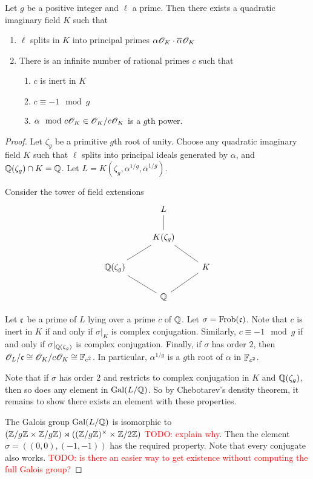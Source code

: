 \documentclass{amsart}
\begin{document}
\begin{lemma}\label{lem:K-exists}
  Let $g$ be a positive integer and $\ell$ a prime. Then there exists a quadratic imaginary field $K$ such that
  \begin{enumerate}
    \item $\ell$ splits in $K$ into principal primes $\alpha\mathscr{O}_K \cdot \overline{\alpha}\mathscr{O}_K$
    \item There is an infinite number of rational primes $c$ such that
    \begin{enumerate}
      \item $c$ is inert in $K$
      \item $c \equiv -1 \mod{g}$
      \item $\alpha \mod c\mathscr{O}_K \in \mathscr{O}_K/c\mathscr{O}_K$ is a $g$th power.
    \end{enumerate}
  \end{enumerate}
\end{lemma}
\begin{proof}
    Let $\zeta_g$ be a primitive $g$th root of unity. Choose any quadratic imaginary field $K$ such that $\ell$ splits into principal ideals generated by $\alpha$, and $\mathbb{Q}(\zeta_g) \cap K = \mathbb{Q}$. Let $L = K(\zeta_g,\alpha^{1/g},\overline{\alpha}^{1/g})$.

  Consider the tower of field extensions
  \[
  \begin{tikzcd}
    &
    L
    \arrow[d,-]
    \\
    &
    K(\zeta_g)
    \arrow[dl,-] \arrow[dr,-]
    \\
    \Q(\zeta_g)
    \arrow[dr,-]
    &&
    K
    \arrow[dl,-]
    \\
    &
    \Q
  \end{tikzcd}
  \]

  Let $\frak{c}$ be a prime of $L$ lying over a prime $c$ of $\mathbb{Q}$. Let $\sigma = \mathrm{Frob}(\frak{c})$. Note that $c$ is inert in $K$ if and only if $\sigma|_K$ is complex conjugation. Similarly, $c \equiv -1 \mod{g}$ if and only if $\sigma|_{\mathbb{Q}(\zeta_g)}$ is complex conjugation.
Finally, if $\sigma$ has order $2$, then $\mathscr{O}_L/\frak{c} \cong \mathscr{O}_K/c\mathscr{O}_K \cong \mathbb{F}_{c^2}$. In particular, $\alpha^{1/g}$ is a $g$th root of $\alpha$ in $\mathbb{F}_{c^2}$.

  Note that if $\sigma$ has order $2$ and restricts to complex conjugation in $K$ and $\mathbb{Q}(\zeta_g)$, then so does any element in $\operatorname{Gal}(L/\mathbb{Q})$. So by Chebotarev's density theorem, it remains to show there exists an element with these properties.

  The Galois group $\operatorname{Gal}(L/\mathbb{Q})$ is isomorphic to $(\mathbb{Z}/g\mathbb{Z} \times \mathbb{Z}/g\mathbb{Z}) \rtimes ((\mathbb{Z}/g\mathbb{Z})^\times \times \mathbb{Z}/2\mathbb{Z})$ \textcolor{red}{TODO: explain why}. Then the element $\sigma = ((0,0),(-1,-1))$ has the required property. Note that every conjugate also works. \textcolor{red}{TODO: is there an easier way to get existence without computing the full Galois group?}
\end{proof}
\end{document}
